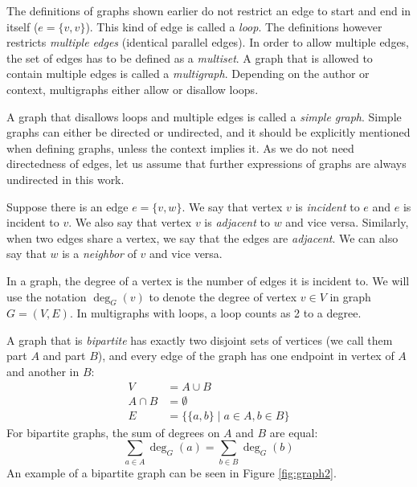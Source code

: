 The definitions of graphs shown earlier do not restrict an edge to start and end in itself ($e=\{v, v\}$).
This kind of edge is called a \emph{loop}.
The definitions however restricts \emph{multiple edges} (identical parallel edges).
In order to allow multiple edges, the set of edges has to be defined as a \emph{multiset}.
A graph that is allowed to contain multiple edges is called a \emph{multigraph}.
Depending on the author or context, multigraphs either allow or disallow loops.

A graph that disallows loops and multiple edges is called a \emph{simple graph}.
Simple graphs can either be directed or undirected, and it should be explicitly mentioned when defining graphs, unless the context implies it.
As we do not need directedness of edges, let us assume that further expressions of graphs are always undirected in this work.

Suppose there is an edge $e=\{v,w\}$.
We say that vertex $v$ is \emph{incident} to $e$ and $e$ is incident to $v$.
We also say that vertex $v$ is \emph{adjacent} to $w$ and vice versa.
Similarly, when two edges share a vertex, we say that the edges are \emph{adjacent}.
We can also say that $w$ is a \emph{neighbor} of $v$ and vice versa.

In a graph, the degree of a vertex is the number of edges it is incident to.
We will use the notation $\deg_G(v)$ to denote the degree of vertex $v \in V$ in graph $G=(V,E)$.
In multigraphs with loops, a loop counts as 2 to a degree.

A graph that is \emph{bipartite} has exactly two disjoint sets of vertices (we call them part $A$ and part $B$), and every edge of the graph has one endpoint in vertex of $A$ and another in $B$:
\begin{align}
V &= A \cup B\\
A \cap B &= \emptyset\\
E &=\{\{a, b\} \mid a \in A, b \in B\}
\end{align}
For bipartite graphs, the sum of degrees on $A$ and $B$ are equal:
\begin{equation} \label{eq:biregular:sum_of_degrees}
\sum_{a\in A} \deg_G(a) = \sum_{b\in B} \deg_G(b)
\end{equation}
An example of a bipartite graph can be seen in Figure \ref{fig:graph2}.


